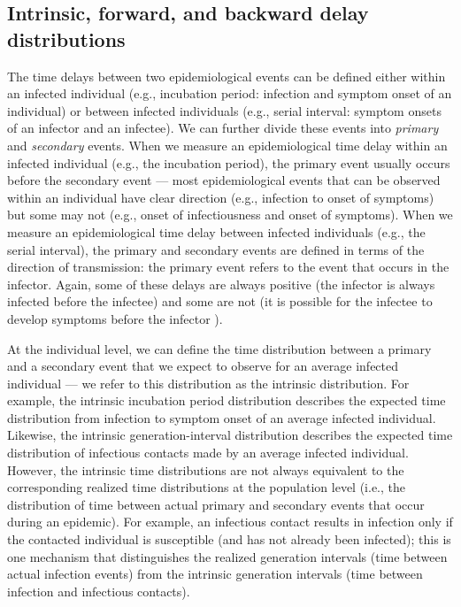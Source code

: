 \documentclass[12pt]{article}
\begin{document}
\subsection{Intrinsic, forward, and backward delay distributions}

The time delays between two epidemiological events can be defined either within an infected individual (e.g., incubation period: infection and symptom onset of an individual) or between infected individuals (e.g., serial interval: symptom onsets of an infector and an infectee).
We can further divide these events into \emph{primary} and \emph{secondary} events.
When we measure an epidemiological time delay within an infected individual (e.g., the incubation period), the primary event usually occurs before the secondary event ---
most epidemiological events that can be observed within an individual have clear direction (e.g., infection to onset of symptoms) but some may not (e.g., onset of infectiousness and onset of symptoms).
When we measure an epidemiological time delay between infected individuals (e.g., the serial interval), 
the primary and secondary events are defined in terms of the direction of transmission:
the primary event refers to the event that occurs in the infector. 
Again, some of these delays are always positive (the infector is always infected before the infectee) and some are not (it is possible for the infectee to develop symptoms before the infector \citep{he2020temporal}).

At the individual level, we can define the time distribution between a primary and a secondary event that we expect to observe for an average infected individual --- we refer to this distribution as the intrinsic distribution.
For example, the intrinsic incubation period distribution describes the expected time distribution from infection to symptom onset of an average infected individual.
Likewise, the intrinsic generation-interval distribution describes the expected time distribution of infectious contacts made by an average infected individual.
However, the intrinsic time distributions are not always equivalent to the corresponding realized time distributions at the population level (i.e., the distribution of time between actual primary and secondary events that occur during an epidemic).
For example, an infectious contact results in infection only if the contacted individual is susceptible (and has not already been infected);
this is one mechanism that distinguishes the realized generation intervals (time between actual infection events) from the intrinsic generation intervals (time between infection and infectious contacts).
\end{document}
